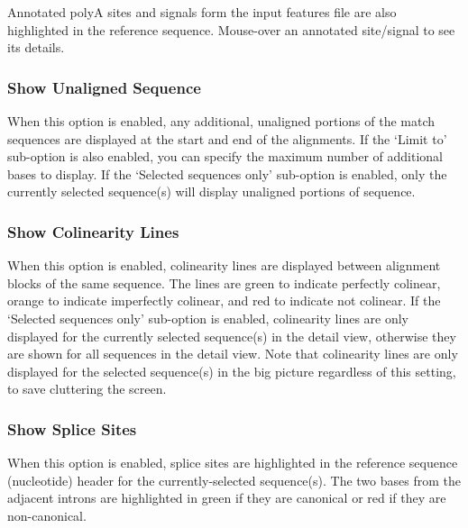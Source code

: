 \documentclass[letterpaper]{article}
\begin{document}
\bigskip

Annotated polyA sites and signals form the input features file are also highlighted in the reference sequence. Mouse-over an annotated site/signal to see its details.

\bigskip

{\color[rgb]{0.30980393,0.5058824,0.7411765}\subsubsection[Show Unaligned Sequence ]{Show Unaligned Sequence }}
\hypertarget{RefHeading2321056909880}{}
When this option is enabled, any additional, unaligned portions of the match sequences are displayed at the start and end of the alignments. If the {\textquoteleft}Limit to{\textquoteright} sub-option is also enabled, you can specify the maximum number of additional bases to display. If the {\textquoteleft}Selected sequences only{\textquoteright} sub-option is enabled, only the currently selected sequence(s) will display unaligned portions of sequence.

\bigskip

{\color[rgb]{0.30980393,0.5058824,0.7411765}\subsubsection[Show Colinearity Lines ]{Show Colinearity Lines }}
\hypertarget{RefHeading2321056909880}{}
When this option is enabled, colinearity lines are displayed between alignment blocks of the same sequence. The lines are green to indicate perfectly colinear, orange to indicate imperfectly colinear, and red to indicate not colinear. If the {\textquoteleft}Selected sequences only{\textquoteright} sub-option is enabled, colinearity lines are only displayed for the currently selected sequence(s) in the detail view, otherwise they are shown for all sequences in the detail view. Note that colinearity lines are only displayed for the selected sequence(s) in the big picture regardless of this setting, to save cluttering the screen.
\bigskip

{\color[rgb]{0.30980393,0.5058824,0.7411765}\subsubsection[Show Splice Sites]{Show Splice Sites}}
\hypertarget{RefHeading2341056909880}{}
When this option is enabled, splice sites are highlighted in the reference sequence (nucleotide) header for the currently-selected sequence(s). The two bases from the adjacent introns are highlighted in green if they are canonical or red if they are non-canonical.
\end{document}
